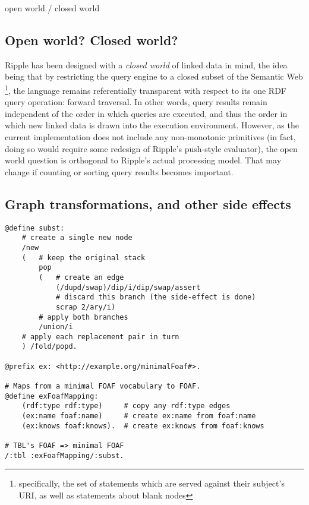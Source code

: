 \documentclass[runningheads]{llncs}
\begin{document}
open world / closed world


\subsection{Open world?  Closed world?}

Ripple has been designed with a \textit{closed world} of linked data in mind, the idea being that by restricting the query engine to a closed subset of the Semantic Web \footnote{specifically, the set of statements which are served against their subject's URI, as well as statements about blank nodes}, the language remains referentially transparent with respect to its one RDF query operation: forward traversal.  In other words, query results remain independent of the order in which queries are executed, and thus the order in which new linked data is drawn into the execution environment.  However, as the current implementation does not include any non-monotonic primitives (in fact, doing so would require some redesign of Ripple's push-style evaluator), the open world question is orthogonal to Ripple's actual processing model.  That may change if counting or sorting query results becomes important.

\subsection{Graph transformations, and other side effects}



\begin{verbatim}
@define subst:
    # create a single new node
    /new
    (   # keep the original stack
        pop
        (   # create an edge
            (/dupd/swap)/dip/i/dip/swap/assert
            # discard this branch (the side-effect is done)
            scrap 2/ary/i)
        # apply both branches
        /union/i
    # apply each replacement pair in turn
    ) /fold/popd.

@prefix ex: <http://example.org/minimalFoaf#>.

# Maps from a minimal FOAF vocabulary to FOAF.
@define exFoafMapping:
    (rdf:type rdf:type)     # copy any rdf:type edges
    (ex:name foaf:name)     # create ex:name from foaf:name
    (ex:knows foaf:knows).  # create ex:knows from foaf:knows

# TBL's FOAF => minimal FOAF
/:tbl :exFoafMapping/:subst.
\end{verbatim}
\end{document}
